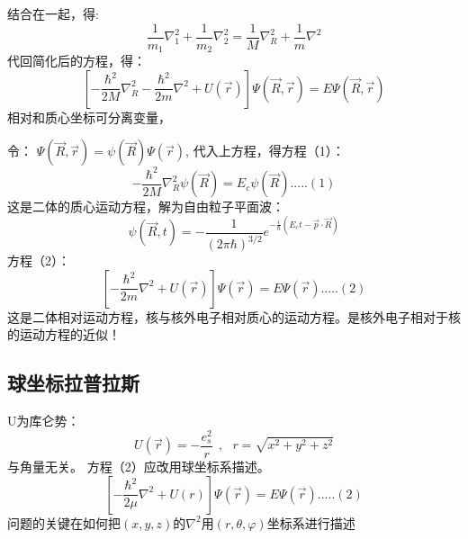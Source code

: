 \begin{frame}
	结合在一起，得:	
	\begin{equation*}
		\dfrac{1}{m_1}\nabla ^2 _1	+ \dfrac{1}{m_2}\nabla ^2 _2 = \dfrac{1}{M}\nabla ^2 _R+ \dfrac{1}{m}\nabla ^2 
	\end{equation*}	
	代回简化后的方程，得：
	\begin{equation*}
		\left[-\frac{\hbar^2}{2 M} \nabla_R ^2  -\frac{\hbar^2}{2 m} \nabla^2 +U(\vec{r} ) \right] \Psi (\vec{R},\vec{r}) =E \Psi (\vec{R},\vec{r}) 
	\end{equation*}
	相对和质心坐标可分离变量，
\end{frame}		

\begin{frame}
	令： $\Psi (\vec{R},\vec{r}) = \psi (\vec{R}) \Psi (\vec{r})  $, 代入上方程，得方程（1）：
	\begin{equation*}
		-\frac{\hbar^2}{2 M} \nabla_R ^2  \psi (\vec{R}) =E_c \psi (\vec{R})  ..... (1)
	\end{equation*}	
	这是二体的质心运动方程，解为自由粒子平面波：
	\begin{equation*}
	\psi (\vec{R},t)=-\frac{1}{(2\pi\hbar)^{3/2}}e^{-\frac{i}{\hbar}(E_c t -\vec{p}\cdot\vec{R})}
	\end{equation*}
	方程（2）：
	\begin{equation*}
		\left[-\frac{\hbar^2}{2 m} \nabla ^2 +U(\vec{r}) \right] \Psi (\vec{r}) =E \Psi (\vec{r})   ..... (2)
	\end{equation*}
	这是二体相对运动方程，核与核外电子相对质心的运动方程。是核外电子相对于核的运动方程的近似！
\end{frame}	

\subsection{球坐标拉普拉斯}

\begin{frame}
	U为库仑势：
	\begin{equation*}
		U(\vec{r})=-\frac{e_s ^2}{r} ~~,~~~ r =\sqrt{x^2+y^2+z^2}
	\end{equation*}	
	与角量无关。 方程（2）应改用球坐标系描述。\\
	\begin{equation*}
		\left[-\frac{\hbar^2}{2 \mu} \nabla ^2 +U(r) \right] \Psi (\vec{r}) =E \Psi (\vec{r})   ..... (2)
	\end{equation*}
	问题的关键在如何把$(x,y,z)$的$\nabla ^2$用$(r,\theta,\varphi)$坐标系进行描述
\end{frame}	


